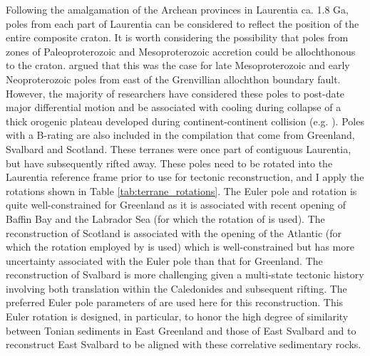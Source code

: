 \documentclass[11pt,letterpaper]{article}
\begin{document}
Following the amalgamation of the Archean provinces in Laurentia ca. 1.8 Ga, poles from each part of Laurentia can be considered to reflect the position of the entire composite craton. It is worth considering the possibility that poles from zones of Paleoproterozoic and Mesoproterozoic accretion could be allochthonous to the craton. \cite{Halls2015b} argued that this was the case for late Mesoproterozoic and early Neoproterozoic poles from east of the Grenvillian allochthon boundary fault. However, the majority of researchers have considered these poles to post-date major differential motion and be associated with cooling during collapse of a thick orogenic plateau developed during continent-continent collision (e.g. \citealp{Brown2012a}). Poles with a B-rating are also included in the compilation that come from Greenland, Svalbard and Scotland. These terranes were once part of contiguous Laurentia, but have subsequently rifted away. These poles need to be rotated into the Laurentia reference frame prior to use for tectonic reconstruction, and I apply the rotations shown in Table \ref{tab:terrane_rotations}. The Euler pole and rotation is quite well-constrained for Greenland as it is associated with recent opening of Baffin Bay and the Labrador Sea (for which the rotation of \citealp{Roest1989a} is used). The reconstruction of Scotland is associated with the opening of the Atlantic (for which the rotation employed by \citealp{Torsvik2017a} is used) which is well-constrained but has more uncertainty associated with the Euler pole than that for Greenland. The reconstruction of Svalbard is more challenging given a multi-state tectonic history involving both translation within the Caledonides and subsequent rifting. The preferred Euler pole parameters of \cite{Maloof2006a} are used here for this reconstruction. This Euler rotation is designed, in particular, to honor the high degree of similarity between Tonian sediments in East Greenland \citep{Hoffman2012a} and those of East Svalbard \citep{Maloof2006a} and to reconstruct East Svalbard to be aligned with these correlative sedimentary rocks.
\end{document}
